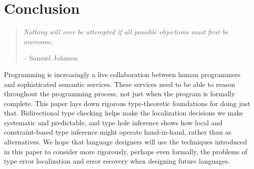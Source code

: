 \section{Conclusion}
\label{sec:conclusion}

\begin{quote}
    \emph{Nothing will ever be attempted if all possible objections must first be overcome.} 
    \begin{flushright}-- Samuel Johnson\end{flushright}
\end{quote}

Programming is increasingly a live collaboration between human programmers and sophisticated semantic services. These services need to be able to reason throughout the programming process, not just when the program is formally complete. This paper lays down rigorous type-theoretic foundations for doing just that. Bidirectional type checking helps make the localization decisions we make systematic and predictable, and type hole inference shows how local and constraint-based type inference might operate hand-in-hand, rather than as alternatives. 
We hope that language designers will use the techniques introduced in this paper to consider more rigorously, perhaps even formally, the problems of type error localization and error recovery when designing future languages. 


